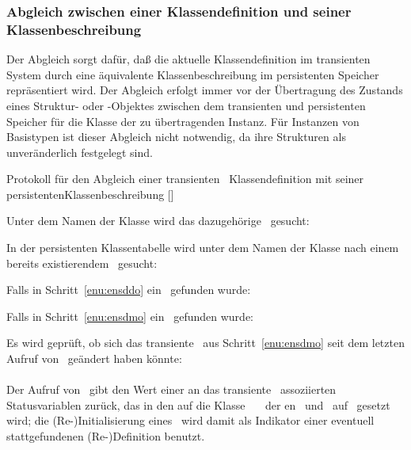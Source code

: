 \subsubsection{Abgleich zwischen einer Klassendefinition und
seiner Klassenbeschreibung}
%
Der Abgleich sorgt daf\"{u}r, da\ss{} die aktuelle Klassendefinition im
transienten System durch eine \"{a}quivalente Klassenbeschreibung im
persistenten Speicher repr\"{a}sentiert wird. Der Abgleich erfolgt immer
vor der \"{U}bertragung des Zustands eines Struktur- oder \clos-Objektes
zwischen dem transienten und persistenten Speicher f\"{u}r die
Klasse der zu \"{u}bertragenden Instanz. F\"{u}r Instanzen von Basistypen
ist dieser Abgleich nicht notwendig, da ihre Strukturen als
un\-ver\-\"{a}n\-der\-lich festgelegt sind.
%
\begin{infol}%
%
\acaption%
 {Protokoll f\"{u}r den Abgleich einer transienten
  \protect\clos\ Klassendefinition mit seiner
  persistentenKlassenbeschreibung}%
 [\protect\enscldescr]%
 \label{pro:escl}%
%
\item\label{enu:ensdmo} Unter dem Namen der Klasse
wird das dazugeh\"{o}rige \clsmo\ gesucht:\\
%
\item\label{enu:ensddo} In der persistenten Klassentabelle
wird unter dem Namen der Klasse nach einem bereits existierendem
\clsdo\ gesucht:\\
%
\item Falls in Schritt~\ref{enu:ensddo} ein \clsdo\ gefunden wurde:
%
\begin{block}%
%
\item Falls in Schritt~\ref{enu:ensdmo} ein \clsmo\ gefunden wurde:
%
\begin{block}%
%
\item\label{enu:ensdmp} Es wird gepr\"{u}ft, ob sich das transiente
  \clsmo\ aus Schritt~\ref{enu:ensdmo} seit dem letzten Aufruf von
  \stfn{\enscldescr}\ ge\"{a}ndert haben k\"{o}nnte:\\
  \\
  Der Aufruf von \ gibt den Wert einer an das
  transiente \clsmo\ assoziierten Statusvariablen zur\"{u}ck, das in
  den auf die Klasse \ \spc[n]\ \mtd[n]\ der \gfn[n]en
  \ und \ auf
  \lispt\ gesetzt wird; die \mbox{(Re-)}Initialisierung eines
  \clsmo[es]\ wird damit als Indikator einer eventuell stattgefundenen
  \mbox{(Re-)}Definition benutzt.
%
\begin{block}%

\end{block}
\end{block}
\end{block}
\end{infol}

